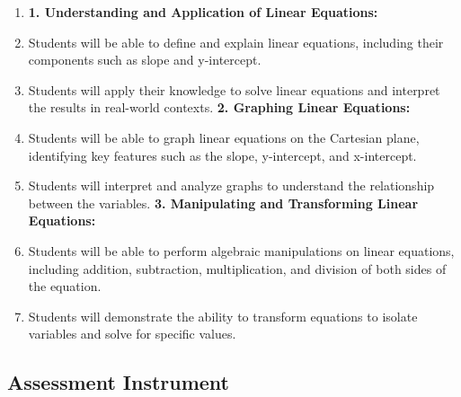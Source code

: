 \begin{enumerate}
    \item \textbf{1. Understanding and Application of Linear Equations:}
    \item Students will be able to define and explain linear equations, including their components such as slope and y-intercept.
    \item Students will apply their knowledge to solve linear equations and interpret the results in real-world contexts. \textbf{2. Graphing Linear Equations:}
    \item Students will be able to graph linear equations on the Cartesian plane, identifying key features such as the slope, y-intercept, and x-intercept.
    \item Students will interpret and analyze graphs to understand the relationship between the variables. \textbf{3. Manipulating and Transforming Linear Equations:}
    \item Students will be able to perform algebraic manipulations on linear equations, including addition, subtraction, multiplication, and division of both sides of the equation.
    \item Students will demonstrate the ability to transform equations to isolate variables and solve for specific values.
\end{enumerate}

\subsection{Assessment Instrument}

